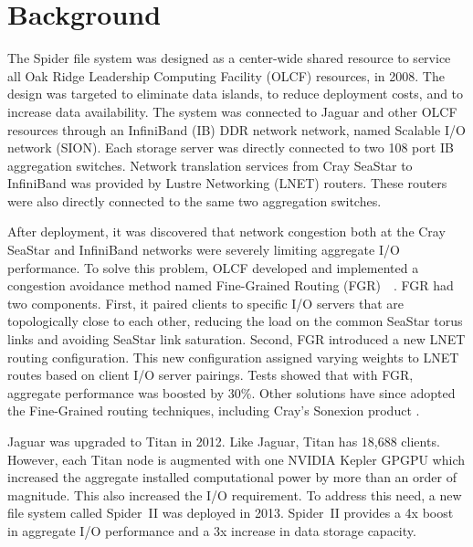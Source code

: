 \section{Background}

The Spider file system was designed as a center-wide shared resource to service
all Oak Ridge Leadership Computing Facility (OLCF) resources, in 2008. The
design was targeted to eliminate data islands, to reduce deployment costs, and
to increase data availability. The system was connected to Jaguar and other
OLCF resources through an InfiniBand (IB) DDR network network, named Scalable
I/O network (SION).  Each storage server was directly connected to two 108 port
IB aggregation switches.  Network translation services from Cray SeaStar to
InfiniBand was provided by Lustre Networking (LNET) routers. These routers were
also directly connected to the same two aggregation switches.    

After deployment, it was discovered that network congestion both at the Cray
SeaStar and InfiniBand networks were severely limiting aggregate I/O
performance. To solve this problem, OLCF developed and implemented a congestion
avoidance method named Fine-Grained Routing
(FGR)~\cite{dillow-fgr}~\cite{dillow-fgr2}. FGR had two components.  First, it
paired clients to specific I/O servers that are topologically close to each
other, reducing the load on the common SeaStar torus links and avoiding SeaStar
link saturation. Second, FGR introduced a new LNET routing configuration. This
new configuration assigned varying weights to LNET routes based on client I/O
server pairings. Tests showed that with FGR, aggregate performance was boosted
by 30\%.  Other solutions have since adopted the Fine-Grained routing
techniques, including Cray's Sonexion product \cite{cray-fgr}.
 
Jaguar was upgraded to Titan in 2012. Like Jaguar, Titan has 18,688 clients.
However, each Titan node is augmented with one NVIDIA Kepler GPGPU
which increased the aggregate installed computational power by more than an
order of magnitude.  This also increased the I/O requirement. To address this
need, a new file system called Spider~II was deployed in 2013. Spider~II
provides a 4x boost in aggregate I/O performance and a 3x increase in data
storage capacity.

